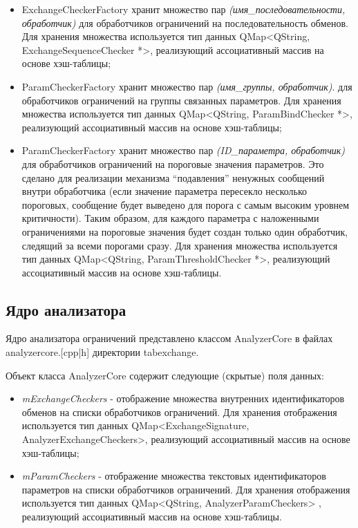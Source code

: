 \begin{itemize}
 \item ExchangeCheckerFactory хранит множество пар 
\textit{(имя\_последовательности, обработчик)} для обработчиков ограничений на 
последовательность обменов. Для хранения множества используется тип данных 
QMap<QString, ExchangeSequenceChecker *>, реализующий ассоциативный массив на 
основе хэш-таблицы;
 \item ParamCheckerFactory хранит множество пар \textit{(имя\_группы, 
обработчик)}. для обработчиков ограничений на группы связанных параметров. Для 
хранения множества используется тип данных QMap<QString, ParamBindChecker *>, 
реализующий ассоциативный массив на основе хэш-таблицы;
 \item ParamCheckerFactory хранит множество пар \textit{(ID\_параметра, 
обработчик)} для обработчиков ограничений на пороговые значения параметров. Это 
сделано для реализации механизма ``подавления'' ненужных сообщений внутри 
обработчика (если значение параметра пересекло несколько пороговых, сообщение 
будет выведено для порога с самым высоким уровнем критичности). Таким образом, 
для каждого параметра с наложенными ограничениями на пороговые значения будет 
создан только один обработчик, следящий за всеми порогами сразу. Для хранения 
множества используется тип данных QMap<QString, ParamThresholdChecker *>, 
реализующий ассоциативный массив на основе хэш-таблицы.
\end{itemize}

\subsection{Ядро анализатора}

Ядро анализатора ограничений представлено классом AnalyzerCore в файлах 
analyzercore.[cpp|h] директории tabexchange.

Объект класса AnalyzerCore содержит следующие (скрытые) поля данных:

\begin{itemize}
 \item \textit{mExchangeCheckers} - отображение множества внутренних 
идентификаторов обменов на списки обработчиков ограничений. Для хранения 
отображения используется тип данных QMap<ExchangeSignature, 
AnalyzerExchangeCheckers>, реализующий ассоциативный массив на основе 
хэш-таблицы;
 \item \textit{mParamCheckers} - отображение множества текстовых 
идентификаторов параметров на списки обработчиков ограничений. Для хранения 
отображения используется тип данных QMap<QString, AnalyzerParamCheckers> , 
реализующий ассоциативный массив на основе хэш-таблицы.
\end{itemize}

